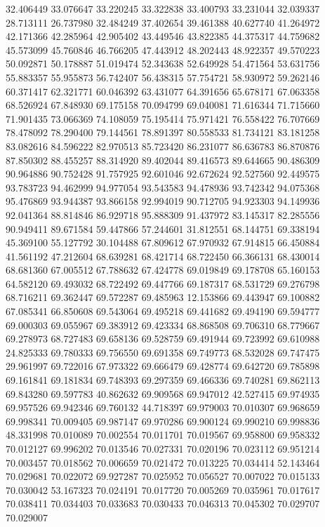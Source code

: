 32.406449
33.076647
33.220245
33.322838
33.400793
33.231044
32.039337
28.713111
26.737980
32.484249
37.402654
39.461388
40.627740
41.264972
42.171366
42.285964
42.905402
43.449546
43.822385
44.375317
44.759682
45.573099
45.760846
46.766205
47.443912
48.202443
48.922357
49.570223
50.092871
50.178887
51.019474
52.343638
52.649928
54.471564
53.631756
55.883357
55.955873
56.742407
56.438315
57.754721
58.930972
59.262146
60.371417
62.321771
60.046392
63.431077
64.391656
65.678171
67.063358
68.526924
67.848930
69.175158
70.094799
69.040081
71.616344
71.715660
71.901435
73.066369
74.108059
75.195414
75.971421
76.558422
76.707669
78.478092
78.290400
79.144561
78.891397
80.558533
81.734121
83.181258
83.082616
84.596222
82.970513
85.723420
86.231077
86.636783
86.870876
87.850302
88.455257
88.314920
89.402044
89.416573
89.644665
90.486309
90.964886
90.752428
91.757925
92.601046
92.672624
92.527560
92.449575
93.783723
94.462999
94.977054
93.543583
94.478936
93.742342
94.075368
95.476869
93.944387
93.866158
92.994019
90.712705
94.923303
94.149936
92.041364
88.814846
86.929718
95.888309
91.437972
83.145317
82.285556
90.949411
89.671584
59.447866
57.244601
31.812551
68.144751
69.338194
45.369100
55.127792
30.104488
67.809612
67.970932
67.914815
66.450884
41.561192
47.212604
68.639281
68.421714
68.722450
66.366131
68.430014
68.681360
67.005512
67.788632
67.424778
69.019849
69.178708
65.160153
64.582120
69.493032
68.722492
69.447766
69.187317
68.531729
69.276798
68.716211
69.362447
69.572287
69.485963
12.153866
69.443947
69.100882
67.085341
66.850608
69.543064
69.495218
69.441682
69.494190
69.594777
69.000303
69.055967
69.383912
69.423334
68.868508
69.706310
68.779667
69.278973
68.727483
69.658136
69.528759
69.491944
69.723992
69.610988
24.825333
69.780333
69.756550
69.691358
69.749773
68.532028
69.747475
29.961997
69.722016
67.973322
69.666479
69.428774
69.642720
69.785898
69.161841
69.181834
69.748393
69.297359
69.466336
69.740281
69.862113
69.843280
69.597783
40.862632
69.909568
69.947012
42.527415
69.974935
69.957526
69.942346
69.760132
44.718397
69.979003
70.010307
69.968659
69.998341
70.009405
69.987147
69.970286
69.900124
69.990210
69.998836
48.331998
70.010089
70.002554
70.011701
70.019567
69.958800
69.958332
70.012127
69.996202
70.013546
70.027331
70.020196
70.023112
69.951214
70.003457
70.018562
70.006659
70.021472
70.013225
70.034414
52.143464
70.029681
70.022072
69.927287
70.025952
70.056527
70.007022
70.015133
70.030042
53.167323
70.024191
70.017720
70.005269
70.035961
70.017617
70.038411
70.034403
70.033683
70.030433
70.046313
70.045302
70.029707
70.029007

